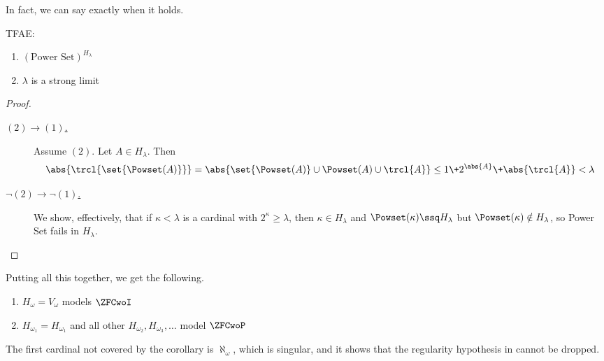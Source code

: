 In fact, we can say exactly when it holds.

\begin{boxlemma} \label{Ch3:Lemma:H_Kappa_Power_Set}
    TFAE:
    \begin{enumerate}[label = (\arabic*)]
        \item $(\text{Power Set})^{H_{\lambda}}$
        \item $\lambda$ is a strong limit
    \end{enumerate}
\end{boxlemma}
\begin{proof} \hfill
    \begin{description}
        \item[\underline{$(2) \to (1)$.}] Assume $(2)$. Let $A \in H_{\lambda}$. Then
        \begin{align*}
            \abs{\trcl{\set{\Powset(A)}}}
            = \abs{\set{\Powset(A)} \cup \Powset(A) \cup \trcl{A}}
            \leq 1 \+ 2^{\abs{A}} \+ \abs{\trcl{A}}
            < \lambda
        \end{align*}

        \item[\underline{$\neg(2) \to \neg(1)$.}] We show, effectively, that if $\kappa < \lambda$ is a cardinal with $2^{\kappa} \geq \lambda$, then $\kappa \in H_{\lambda}$ and $\Powset(\kappa) \ssq H_{\lambda}$ but $\Powset(\kappa) \notin H_{\lambda}$, so Power Set fails in $H_{\lambda}$.
    \end{description}
\end{proof}

Putting all this together, we get the following.

\begin{boxcorollary} \hfill
    \begin{enumerate}
        \item $H_{\omega} = V_{\omega}$ models $\ZFCwoI$
        \item $H_{\omega_1} = H_{\omega_1}$ and all other $H_{\omega_2}, H_{\omega_3}, \ldots$ model $\ZFCwoP$
    \end{enumerate}
\end{boxcorollary}

The first cardinal not covered by the corollary is $\aleph_{\omega}$, which is singular, and it shows that the regularity hypothesis in  cannot be dropped.

